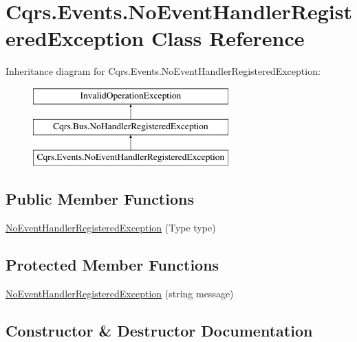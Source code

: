 \hypertarget{classCqrs_1_1Events_1_1NoEventHandlerRegisteredException}{}\section{Cqrs.\+Events.\+No\+Event\+Handler\+Registered\+Exception Class Reference}
\label{classCqrs_1_1Events_1_1NoEventHandlerRegisteredException}
Inheritance diagram for Cqrs.\+Events.\+No\+Event\+Handler\+Registered\+Exception\+:\begin{figure}[H]
\begin{center}
\leavevmode
\includegraphics[height=3.000000cm]{classCqrs_1_1Events_1_1NoEventHandlerRegisteredException}
\end{center}
\end{figure}
\subsection*{Public Member Functions}
\begin{DoxyCompactItemize}
\item 
\hyperlink{classCqrs_1_1Events_1_1NoEventHandlerRegisteredException_a07a69b1708c7352f7ed4945bd59cfc3e_a07a69b1708c7352f7ed4945bd59cfc3e}{No\+Event\+Handler\+Registered\+Exception} (Type type)
\end{DoxyCompactItemize}
\subsection*{Protected Member Functions}
\begin{DoxyCompactItemize}
\item 
\hyperlink{classCqrs_1_1Events_1_1NoEventHandlerRegisteredException_aa09c7226056f4da196f46165cb4b2fb3_aa09c7226056f4da196f46165cb4b2fb3}{No\+Event\+Handler\+Registered\+Exception} (string message)
\end{DoxyCompactItemize}


\subsection{Constructor \& Destructor Documentation}
\mbox{\label{classCqrs_1_1Events_1_1NoEventHandlerRegisteredException_a07a69b1708c7352f7ed4945bd59cfc3e_a07a69b1708c7352f7ed4945bd59cfc3e}} 
